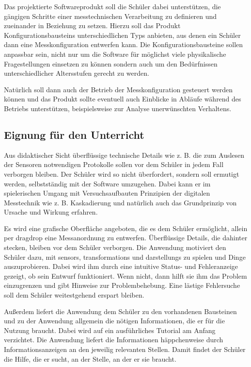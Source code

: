 \documentclass[parskip=full]{scrartcl}
\begin{document}
Das projektierte Softwareprodukt soll die Schüler dabei unterstützen, die gängigen Schritte einer messtechnischen Verarbeitung zu definieren und zueinander in Beziehung zu setzen. Hierzu soll das Produkt \glspl{Konfigurationsbaustein} unterschiedlichen Typs anbieten, aus denen ein Schüler dann eine Messkonfiguration entwerfen kann. Die Konfigurationsbausteine sollen anpassbar sein, nicht nur um die Software für möglichst viele physikalische Fragestellungen einsetzen zu können sondern auch um den Bedürfnissen unterschiedlicher Altersstufen gerecht zu werden. 

Natürlich soll dann auch der Betrieb der Messkonfiguration gesteuert werden können und das Produkt sollte eventuell auch Einblicke in Abläufe während des Betriebs unterstützen, beispielsweise zur Analyse unerwünschten Verhaltens.

\subsection{Eignung für den Unterricht}

Aus didaktischer Sicht überflüssige technische Details wie z. B. die zum Auslesen der Sensoren notwendigen Protokolle sollen vor dem Schüler in jedem Fall verborgen bleiben.
Der Schüler wird so nicht überfordert, sondern soll ermutigt werden, selbstständig mit der Software umzugehen. 
Dabei kann er im spielerischen Umgang mit Versuchsaufbauten Prinzipien der digitalen Messtechnik wie z. B. Kaskadierung und natürlich auch das Grundprinzip von Ursache und Wirkung erfahren.

Es wird eine grafische Oberfläche angeboten, die es dem Schüler ermöglicht, allein per \gls{dragdrop} eine Messanordnung zu entwerfen. 
Überflüssige Details, die dahinter stecken, bleiben vor dem Schüler verborgen.
Die Anwendung motiviert den Schüler dazu, mit \glspl{sensor}, \glspl{transformation} und \glspl{darstellung} zu spielen und Dinge auszuprobieren. 
Dabei wird ihm durch eine intuitive Status- und Fehleranzeige gezeigt, ob sein Entwurf funktioniert. 
Wenn nicht, dann hilft sie ihm das Problem einzugrenzen und gibt Hinweise zur Problembehebung. 
Eine lästige Fehlersuche soll dem Schüler weitestgehend erspart bleiben. 

Außerdem liefert die Anwendung dem Schüler zu den vorhandenen Bausteinen und zu der Anwendung allgemein die nötigen Informationen, die er für die Nutzung braucht. Dabei wird auf ein ausführliches Tutorial am Anfang verzichtet. Die Anwendung liefert die Informationen häppchenweise durch Informationsanzeigen an den jeweilig relevanten Stellen. Damit findet der Schüler die Hilfe, die er sucht, an der Stelle, an der er sie braucht.
\end{document}
